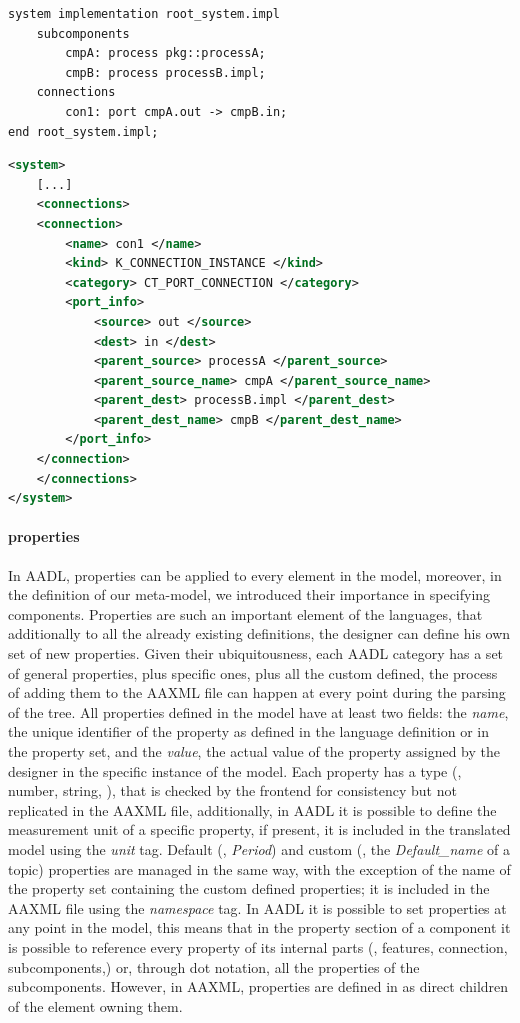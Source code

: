 \begin{lstlisting}[language=AADL,caption={TODO caption},label=lst:con-aadl]
system implementation root_system.impl
	subcomponents
		cmpA: process pkg::processA;
		cmpB: process processB.impl;
	connections
		con1: port cmpA.out -> cmpB.in;
end root_system.impl;
\end{lstlisting}

\begin{lstlisting}[language=XML,caption={TODO caption},label=lst:con-aaxml]
<system>
	[...]
	<connections>
	<connection>
		<name> con1 </name>
		<kind> K_CONNECTION_INSTANCE </kind>
		<category> CT_PORT_CONNECTION </category>
		<port_info>
			<source> out </source>
			<dest> in </dest>
			<parent_source> processA </parent_source>
			<parent_source_name> cmpA </parent_source_name>
			<parent_dest> processB.impl </parent_dest>
			<parent_dest_name> cmpB </parent_dest_name>
		</port_info>
	</connection>
	</connections>
</system>
\end{lstlisting}

\paragraph{properties} In AADL, properties can be applied to every element in the model, moreover, in the definition of our meta-model, we introduced their importance in specifying components. Properties are such an important element of the languages, that additionally to all the already existing definitions, the designer can define his own set of new properties. Given their ubiquitousness, each AADL category has a set of general properties, plus specific ones, plus all the custom defined, the process of adding them to the AAXML file can happen at every point during the parsing of the tree. All properties defined in the model have at least two fields: the \textit{name}, the unique identifier of the property as defined in the language definition or in the property set, and the \textit{value}, the actual value of the property assigned by the designer in the specific instance of the model. Each property has a type (\eg, number, string, \etc), that is checked by the frontend for consistency but not replicated in the AAXML file, additionally, in AADL it is possible to define the measurement unit of a specific property, if present, it is included in the translated model using the \textit{unit} tag. Default (\eg, \textit{Period}) and custom (\eg, the \textit{Default\_name} of a topic) properties are managed in the same way, with the exception of the name of the property set containing the custom defined properties; it is included in the AAXML file using the \textit{namespace} tag. In AADL it is possible to set properties at any point in the model, this means that in the property section of a component it is possible to reference every property of its internal parts (\eg, features, connection, subcomponents,\etc) or, through dot notation, all the properties of the subcomponents. However, in AAXML, properties are defined in as direct children of the element owning them.

